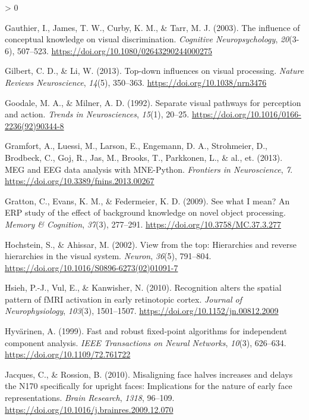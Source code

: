 \documentclass[
  english,
  man,12pt,twoside]{apa7}
\newlength{\cslhangindent}
\newenvironment{CSLReferences}[2] %
 {%
  \setlength{\parindent}{0pt}
  \ifodd #1 \everypar{\setlength{\hangindent}{\cslhangindent}}\ignorespaces\fi
  \ifnum #2 > 0
  \setlength{\parskip}{#2\baselineskip}
  \fi
 }%
 {}
\begin{document}
\begin{CSLReferences}{1}{0}
\leavevmode\hypertarget{ref-gauthier2003}{}%
Gauthier, I., James, T. W., Curby, K. M., \& Tarr, M. J. (2003). The influence of conceptual knowledge on visual discrimination. \emph{Cognitive Neuropsychology}, \emph{20}(3-6), 507--523. \url{https://doi.org/10.1080/02643290244000275}

\leavevmode\hypertarget{ref-gilbert2013}{}%
Gilbert, C. D., \& Li, W. (2013). Top-down influences on visual processing. \emph{Nature Reviews Neuroscience}, \emph{14}(5), 350--363. \url{https://doi.org/10.1038/nrn3476}

\leavevmode\hypertarget{ref-goodale1992}{}%
Goodale, M. A., \& Milner, A. D. (1992). Separate visual pathways for perception and action. \emph{Trends in Neurosciences}, \emph{15}(1), 20--25. \url{https://doi.org/10.1016/0166-2236(92)90344-8}

\leavevmode\hypertarget{ref-gramfort2013}{}%
Gramfort, A., Luessi, M., Larson, E., Engemann, D. A., Strohmeier, D., Brodbeck, C., Goj, R., Jas, M., Brooks, T., Parkkonen, L., \& al., et. (2013). MEG and {EEG} data analysis with {MNE-Python}. \emph{Frontiers in Neuroscience}, \emph{7}. \url{https://doi.org/10.3389/fnins.2013.00267}

\leavevmode\hypertarget{ref-gratton2009}{}%
Gratton, C., Evans, K. M., \& Federmeier, K. D. (2009). See what {I} mean? An {ERP} study of the effect of background knowledge on novel object processing. \emph{Memory \& Cognition}, \emph{37}(3), 277--291. \url{https://doi.org/10.3758/MC.37.3.277}

\leavevmode\hypertarget{ref-hochstein2002}{}%
Hochstein, S., \& Ahissar, M. (2002). View from the top: Hierarchies and reverse hierarchies in the visual system. \emph{Neuron}, \emph{36}(5), 791--804. \url{https://doi.org/10.1016/S0896-6273(02)01091-7}

\leavevmode\hypertarget{ref-hsieh2010}{}%
Hsieh, P.-J., Vul, E., \& Kanwisher, N. (2010). Recognition alters the spatial pattern of {fMRI} activation in early retinotopic cortex. \emph{Journal of Neurophysiology}, \emph{103}(3), 1501--1507. \url{https://doi.org/10.1152/jn.00812.2009}

\leavevmode\hypertarget{ref-hyvuxe4rinen1999}{}%
Hyvärinen, A. (1999). Fast and robust fixed-point algorithms for independent component analysis. \emph{IEEE Transactions on Neural Networks}, \emph{10}(3), 626--634. \url{https://doi.org/10.1109/72.761722}

\leavevmode\hypertarget{ref-jacques2010}{}%
Jacques, C., \& Rossion, B. (2010). Misaligning face halves increases and delays the {N170} specifically for upright faces: Implications for the nature of early face representations. \emph{Brain Research}, \emph{1318}, 96--109. \url{https://doi.org/10.1016/j.brainres.2009.12.070}


\end{CSLReferences}
\end{document}
